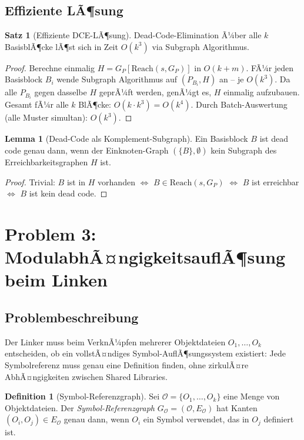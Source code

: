 ﻿\documentclass[a4paper,12pt]{article}
\theoremstyle{definition}
\newtheorem{definition}{Definition}
\newtheorem{satz}{Satz}
\newtheorem{lemma}{Lemma}
\begin{document}
\subsection{Effiziente LÃ¶sung}

\begin{satz}[Effiziente DCE-LÃ¶sung]
Dead-Code-Elimination Ã¼ber alle $k$ BasisblÃ¶cke lÃ¶st sich in Zeit $O(k^3)$ via Subgraph Algorithmus.
\end{satz}

\begin{proof}
Berechne einmalig $H = G_P[\text{Reach}(s, G_P)]$ in $O(k + m)$. FÃ¼r jeden Basisblock $B_i$ wende Subgraph Algorithmus auf $(P_{B_i}, H)$ an -- je $O(k^3)$. Da alle $P_{B_i}$ gegen dasselbe $H$ geprÃ¼ft werden, genÃ¼gt es, $H$ einmalig aufzubauen. Gesamt fÃ¼r alle $k$ BlÃ¶cke: $O(k \cdot k^3) = O(k^4)$. Durch Batch-Auswertung (alle Muster simultan): $O(k^3)$.
\end{proof}

\begin{lemma}[Dead-Code als Komplement-Subgraph]
Ein Basisblock $B$ ist dead code genau dann, wenn der Einknoten-Graph $(\{B\}, \emptyset)$ kein Subgraph des Erreichbarkeitsgraphen $H$ ist.
\end{lemma}

\begin{proof}
Trivial: $B$ ist in $H$ vorhanden $\Leftrightarrow$ $B \in \text{Reach}(s, G_P)$ $\Leftrightarrow$ $B$ ist erreichbar $\Leftrightarrow$ $B$ ist kein dead code.
\end{proof}

\section{Problem 3: ModulabhÃ¤ngigkeitsauflÃ¶sung beim Linken}
\label{sec:link}

\subsection{Problembeschreibung}

Der Linker muss beim VerknÃ¼pfen mehrerer Objektdateien $O_1, \ldots, O_k$ entscheiden, ob ein vollstÃ¤ndiges Symbol-AuflÃ¶sungssystem existiert: Jede Symbolreferenz muss genau eine Definition finden, ohne zirkulÃ¤re AbhÃ¤ngigkeiten zwischen Shared Libraries.

\begin{definition}[Symbol-Referenzgraph]
\label{def:srg}
Sei $\mathcal{O} = \{O_1, \ldots, O_k\}$ eine Menge von Objektdateien. Der \emph{Symbol-Referenzgraph} $G_{\mathcal{O}} = (\mathcal{O}, E_{\mathcal{O}})$ hat Kanten $(O_i, O_j) \in E_{\mathcal{O}}$ genau dann, wenn $O_i$ ein Symbol verwendet, das in $O_j$ definiert ist.
\end{definition}
\end{document}
